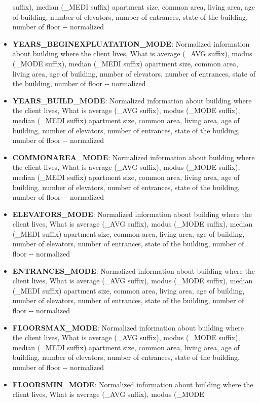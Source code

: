 \documentclass[11pt]{article}
\begin{document}
\begin{itemize}
  suffix), median (\_MEDI suffix) apartment size, common area, living
  area, age of building, number of elevators, number of entrances, state
  of the building, number of floor -\/- normalized
\item
  \textbf{YEARS\_BEGINEXPLUATATION\_MODE}: Normalized information about
  building where the client lives, What is average (\_AVG suffix), modus
  (\_MODE suffix), median (\_MEDI suffix) apartment size, common area,
  living area, age of building, number of elevators, number of
  entrances, state of the building, number of floor -\/- normalized
\item
  \textbf{YEARS\_BUILD\_MODE}: Normalized information about building
  where the client lives, What is average (\_AVG suffix), modus (\_MODE
  suffix), median (\_MEDI suffix) apartment size, common area, living
  area, age of building, number of elevators, number of entrances, state
  of the building, number of floor -\/- normalized
\item
  \textbf{COMMONAREA\_MODE}: Normalized information about building where
  the client lives, What is average (\_AVG suffix), modus (\_MODE
  suffix), median (\_MEDI suffix) apartment size, common area, living
  area, age of building, number of elevators, number of entrances, state
  of the building, number of floor -\/- normalized
\item
  \textbf{ELEVATORS\_MODE}: Normalized information about building where
  the client lives, What is average (\_AVG suffix), modus (\_MODE
  suffix), median (\_MEDI suffix) apartment size, common area, living
  area, age of building, number of elevators, number of entrances, state
  of the building, number of floor -\/- normalized
\item
  \textbf{ENTRANCES\_MODE}: Normalized information about building where
  the client lives, What is average (\_AVG suffix), modus (\_MODE
  suffix), median (\_MEDI suffix) apartment size, common area, living
  area, age of building, number of elevators, number of entrances, state
  of the building, number of floor -\/- normalized
\item
  \textbf{FLOORSMAX\_MODE}: Normalized information about building where
  the client lives, What is average (\_AVG suffix), modus (\_MODE
  suffix), median (\_MEDI suffix) apartment size, common area, living
  area, age of building, number of elevators, number of entrances, state
  of the building, number of floor -\/- normalized
\item
  \textbf{FLOORSMIN\_MODE}: Normalized information about building where
  the client lives, What is average (\_AVG suffix), modus (\_MODE

\end{itemize}
\end{document}
